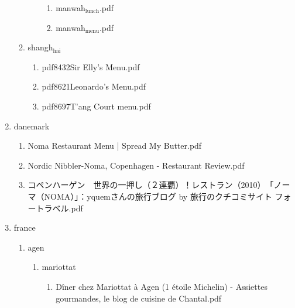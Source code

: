 \documentclass[11pt]{article}
\begin{document}
\begin{enumerate}
\begin{enumerate}
\begin{enumerate}
\begin{enumerate}
\item manwah$_{\text{lunch}}$.pdf
\label{sec-1-1-1-1-21-10-1-1-4-5}

\item manwah$_{\text{menu}}$.pdf
\label{sec-1-1-1-1-21-10-1-1-4-6}
\end{enumerate}
\end{enumerate}

\item shangh$_{\text{hai}}$
\label{sec-1-1-1-1-21-10-1-2}
\begin{enumerate}
\item pdf8432Sir Elly's Menu.pdf
\label{sec-1-1-1-1-21-10-1-2-1}

\item pdf8621Leonardo's  Menu.pdf
\label{sec-1-1-1-1-21-10-1-2-2}

\item pdf8697T'ang Court menu.pdf
\label{sec-1-1-1-1-21-10-1-2-3}
\end{enumerate}
\end{enumerate}

\item danemark
\label{sec-1-1-1-1-21-10-2}
\begin{enumerate}
\item Noma Restaurant Menu | Spread My Butter.pdf
\label{sec-1-1-1-1-21-10-2-1}

\item Nordic Nibbler-Noma, Copenhagen - Restaurant Review.pdf
\label{sec-1-1-1-1-21-10-2-2}

\item コペンハーゲン　世界の一押し（２連覇）！レストラン（2010）　「ノーマ（NOMA）」：yquemさんの旅行ブログ by 旅行のクチコミサイト フォートラベル.pdf
\label{sec-1-1-1-1-21-10-2-3}
\end{enumerate}

\item france
\label{sec-1-1-1-1-21-10-3}
\begin{enumerate}
\item agen
\label{sec-1-1-1-1-21-10-3-1}
\begin{enumerate}
\item mariottat
\label{sec-1-1-1-1-21-10-3-1-1}
\begin{enumerate}
\item Dîner chez Mariottat à Agen (1 étoile Michelin) - Assiettes gourmandes, le blog de cuisine de Chantal.pdf
\label{sec-1-1-1-1-21-10-3-1-1-1}
\end{enumerate}
\end{enumerate}


\end{enumerate}
\end{enumerate}
\end{document}
